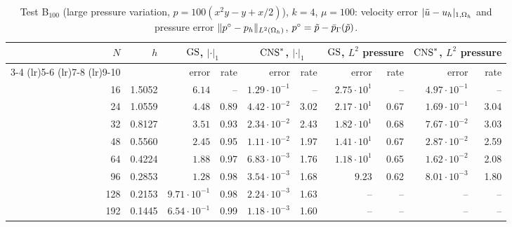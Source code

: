 \begin{table}[t]
\centering
\caption{Test B$_{100}$ (large pressure variation, $p=100(x^2y-y+x/2)$), $k=4$, $\mu=100$: velocity error $|\tilde u-u_h|_{1,\Omega_h}$ and pressure error $\lVert p^\circ-p_h\rVert_{L^2(\Omega_h)}$, $p^\circ=\tilde p-\bar p_{\Gamma}(\tilde p)$.}\label{tab:B100}
\small
\begin{tabular}{rrrrrrrrrr}
\toprule
$N$ & $h$ & \multicolumn{2}{c}{$\mathrm{GS}$, $|\cdot|_1$} & \multicolumn{2}{c}{$\mathrm{CNS}^\ast$, $|\cdot|_1$} & \multicolumn{2}{c}{$\mathrm{GS}$, $L^2$ pressure} & \multicolumn{2}{c}{$\mathrm{CNS}^\ast$, $L^2$ pressure}\\
\cmidrule(lr){3-4} \cmidrule(lr){5-6} \cmidrule(lr){7-8} \cmidrule(lr){9-10}
 & & error & rate & error & rate & error & rate & error & rate\\
\midrule
16 & 1.5052 & $6.14$ & -- & $1.29\cdot10^{-1}$ & -- & $2.75\cdot10^{1}$ & -- & $4.97\cdot10^{-1}$ & --\\
24 & 1.0559 & $4.48$ & 0.89 & $4.42\cdot10^{-2}$ & 3.02 & $2.17\cdot10^{1}$ & 0.67 & $1.69\cdot10^{-1}$ & 3.04\\
32 & 0.8127 & $3.51$ & 0.93 & $2.34\cdot10^{-2}$ & 2.43 & $1.82\cdot10^{1}$ & 0.68 & $7.67\cdot10^{-2}$ & 3.03\\
48 & 0.5560 & $2.45$ & 0.95 & $1.11\cdot10^{-2}$ & 1.97 & $1.41\cdot10^{1}$ & 0.67 & $2.87\cdot10^{-2}$ & 2.59\\
64 & 0.4224 & $1.88$ & 0.97 & $6.83\cdot10^{-3}$ & 1.76 & $1.18\cdot10^{1}$ & 0.65 & $1.62\cdot10^{-2}$ & 2.08\\
96 & 0.2853 & $1.28$ & 0.98 & $3.54\cdot10^{-3}$ & 1.68 & $9.23$ & 0.62 & $8.01\cdot10^{-3}$ & 1.80\\
128 & 0.2153 & $9.71\cdot10^{-1}$ & 0.98 & $2.24\cdot10^{-3}$ & 1.63 & -- & -- & -- & --\\
192 & 0.1445 & $6.54\cdot10^{-1}$ & 0.99 & $1.18\cdot10^{-3}$ & 1.60 & -- & -- & -- & --\\
\bottomrule
\end{tabular}
\end{table}
